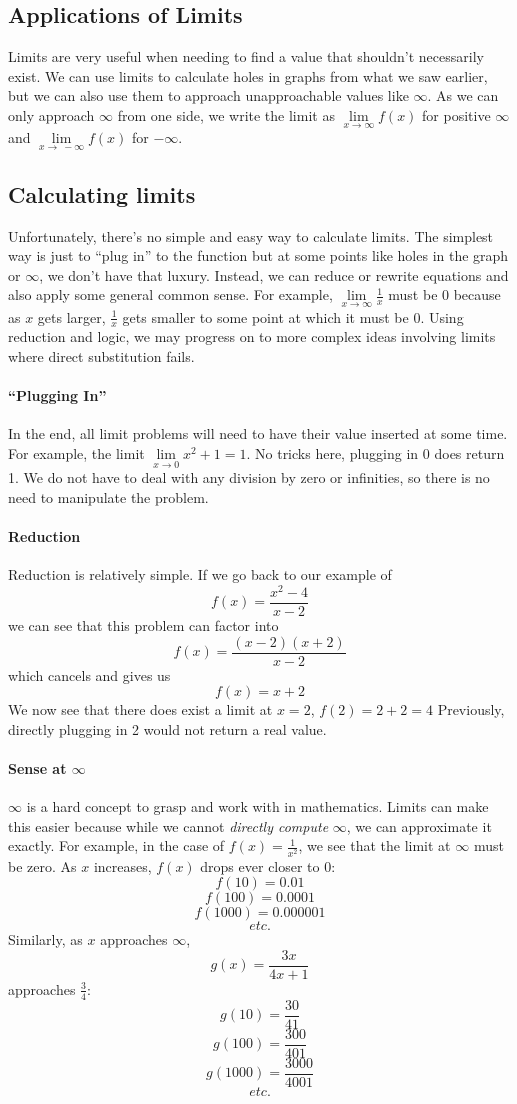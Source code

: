 \documentclass[../main.tex]{subfiles}
\begin{document}
\subsection{Applications of Limits} Limits are very useful when needing to find a value that shouldn't necessarily exist. We can use limits to calculate holes in graphs from what we saw earlier, but we can also use them to approach unapproachable values like $\infty$. As we can only approach $\infty$ from one side, we write the limit as $\lim\limits_{x\to\infty} f(x)$ for positive $\infty$ and $\lim\limits_{x\to\ -\infty} f(x)$ for $-\infty$.
\subsection{Calculating limits} Unfortunately, there's no simple and easy way to calculate limits. The simplest way is just to ``plug in'' to the function but at some points like holes in the graph or $\infty$, we don't have that luxury. Instead, we can reduce or rewrite equations and also apply some general common sense. For example, $\lim\limits_{x\to\infty} \frac{1}{x}$ must be 0 because as $x$ gets larger, $\frac{1}{x}$ gets smaller to some point at which it must be 0. Using reduction and logic, we may progress on to more complex ideas involving limits where direct substitution fails.
\paragraph{``Plugging In''} In the end, all limit problems will need to have their value inserted at some time. For example, the limit $\lim\limits_{x\to 0} x^2+1=1$. No tricks here, plugging in 0 does return 1. We do not have to deal with any division by zero or infinities, so there is no need to manipulate the problem.
\paragraph{Reduction} Reduction is relatively simple. If we go back to our example of $$f(x)=\frac{x^2-4}{x-2}$$ we can see that this problem can factor into $$f(x)=\frac{(x-2)(x+2)}{x-2}$$ which cancels and gives us $$f(x)=x+2$$We now see that there does exist a limit at $x=2$, $f(2)=2+2=4$ Previously, directly plugging in 2 would not return a real value.
\paragraph{Sense at $\infty$} $\infty$ is a hard concept to grasp and work with in mathematics. Limits can make this easier because while we cannot \textit{directly compute} $\infty$, we can approximate it exactly. For example, in the case of $f(x)=\frac{1}{x^2}$, we see that the limit at $\infty$ must be zero. As $x$ increases, $f(x)$ drops ever closer to 0:$$f(10)=0.01$$$$f(100)=0.0001$$$$f(1000)=0.000001$$$$etc.$$ Similarly, as $x$ approaches $\infty$, $$g(x)=\frac{3x}{4x+1}$$ approaches $\frac{3}{4}$: $$g(10)=\frac{30}{41}$$$$g(100)=\frac{300}{401}$$$$g(1000)=\frac{3000}{4001}$$$$etc.$$
\end{document}
